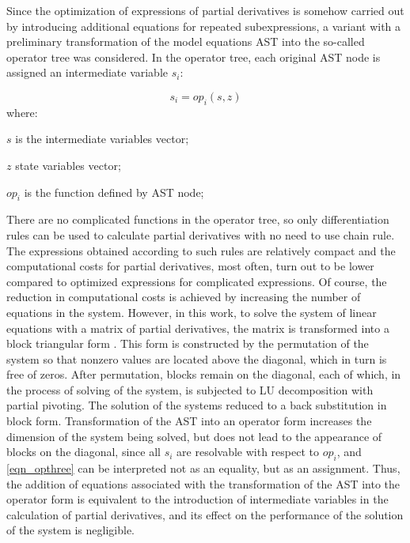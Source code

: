 \documentclass[lettersize,journal]{IEEEtran}
\begin{document}
Since the optimization of expressions of partial derivatives is somehow carried out by introducing additional equations for repeated subexpressions,
a variant with a preliminary transformation of the model equations AST into the so-called operator tree was considered. In the operator tree, 
each original AST node is assigned an intermediate variable \(s_i\):

\begin{equation}
	\label{eqn_opthree}
	s_i=op_i(s,z)
\end{equation}
\noindent where:
\begin{description}
	\item  \(s\) is the intermediate variables vector;
	\item  \(z\) state variables vector;
	\item  \(op_i\) is the function defined by AST node;
\end{description}

There are no complicated functions in the operator tree, so only differentiation rules can be used to calculate partial derivatives with no need
to use chain rule. The expressions obtained according to such rules are relatively compact and the computational costs for partial
derivatives, most often, turn out to be lower compared to optimized expressions for complicated expressions. Of course, the reduction in 
computational costs is achieved by increasing the number of equations in the system. However, in this work, to solve the system of linear equations
with a matrix of partial derivatives, the matrix is transformed into a block triangular form \cite{davis12}. This form is constructed by  
the permutation of the system so that nonzero values are located above the diagonal, which in turn is free of zeros. 
After permutation, blocks remain on the diagonal, each of which, in the process of solving of the system, is subjected to LU decomposition 
with partial pivoting. The solution of the systems reduced to a back substitution in block form. Transformation of the AST into an operator form 
increases the dimension of the system being solved, but does not lead to the appearance of blocks on the diagonal, since all \(s_i\) are 
resolvable with respect to \(op_i\), and \eqref{eqn_opthree} can be interpreted not as an equality, but as an assignment. Thus, the addition 
of equations associated with the transformation of the AST into the operator form is equivalent to the introduction of intermediate variables in the
calculation of partial derivatives, and its effect on the performance of the solution of the system is negligible.
\end{document}
